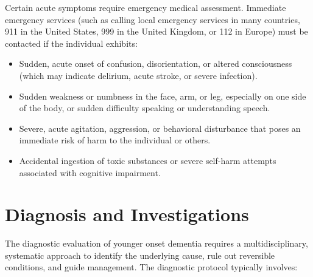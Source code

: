 Certain acute symptoms require emergency medical assessment. Immediate emergency services (such as calling local emergency services in many countries, 911 in the United States, 999 in the United Kingdom, or 112 in Europe) must be contacted if the individual exhibits:
\begin{itemize}
    \item Sudden, acute onset of confusion, disorientation, or altered consciousness (which may indicate delirium, acute stroke, or severe infection).
    \item Sudden weakness or numbness in the face, arm, or leg, especially on one side of the body, or sudden difficulty speaking or understanding speech.
    \item Severe, acute agitation, aggression, or behavioral disturbance that poses an immediate risk of harm to the individual or others.
    \item Accidental ingestion of toxic substances or severe self-harm attempts associated with cognitive impairment.
\end{itemize}

\section*{Diagnosis and Investigations}
The diagnostic evaluation of younger onset dementia requires a multidisciplinary, systematic approach to identify the underlying cause, rule out reversible conditions, and guide management. The diagnostic protocol typically involves:

